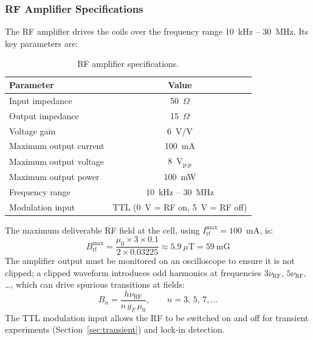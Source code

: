 \subsubsection*{RF Amplifier Specifications}
 
The RF amplifier drives the coils over the frequency range 10~kHz -- 30~MHz. Its
key parameters are:
 
\begin{table}[h]
    \centering
    \begin{tabular}{lc}
        \hline
        Parameter & Value \\
        \hline
        Input impedance         & 50~$\Omega$ \\
        Output impedance        & 15~$\Omega$ \\
        Voltage gain            & 6~V/V \\
        Maximum output current  & 100~mA \\
        Maximum output voltage  & 8~V$_{\text{p-p}}$ \\
        Maximum output power    & 100~mW \\
        Frequency range         & 10~kHz -- 30~MHz \\
        Modulation input        & TTL (0~V = RF on, 5~V = RF off) \\
        \hline
    \end{tabular}
    \caption{RF amplifier specifications.}
\end{table}
 
\noindent
The maximum deliverable RF field at the cell, using $I_{\text{rf}}^{\text{max}} = 100$~mA,
is:
\begin{equation}
    B_{\text{rf}}^{\text{max}} = \frac{\mu_0 \times 3 \times 0.1}{2 \times 0.03225}
    \approx 5.9\ \mu\text{T} = 59\ \text{mG}
\end{equation}
The amplifier output must be monitored on an oscilloscope to ensure it is not clipped;
a clipped waveform introduces odd harmonics at frequencies $3\nu_{\text{RF}}$,
$5\nu_{\text{RF}}$, \ldots, which can drive spurious transitions at fields:
\begin{equation}
    B_n = \frac{h\nu_{\text{RF}}}{n\,g_F\,\mu_0}, \qquad n = 3,\,5,\,7,\ldots
\end{equation}
The TTL modulation input allows the RF to be switched on and off for transient
experiments (Section~\ref{sec:transient}) and lock-in detection.